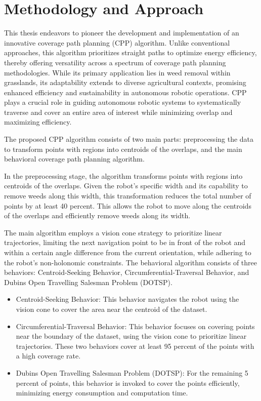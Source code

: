 \section{Methodology and Approach}


This thesis endeavors to pioneer the development and implementation of an innovative coverage path planning (CPP) algorithm. Unlike conventional approaches, this algorithm prioritizes straight paths to optimize energy efficiency, thereby offering versatility across a spectrum of coverage path planning methodologies. While its primary application lies in weed removal within grasslands, its adaptability extends to diverse agricultural contexts, promising enhanced efficiency and sustainability in autonomous robotic operations. CPP plays a crucial role in guiding autonomous robotic systems to systematically traverse and cover an entire area of interest while minimizing overlap and maximizing efficiency. 

\vspace*{3mm} 

The proposed CPP algorithm consists of two main parts: preprocessing the data to transform points with regions into centroids of the overlaps, and the main behavioral coverage path planning algorithm.

\vspace*{3mm} 

In the preprocessing stage, the algorithm transforms points with regions into centroids of the overlaps. Given the robot's specific width and its capability to remove weeds along this width, this transformation reduces the total number of points by at least 40 percent. This allows the robot to move along the centroids of the overlaps and efficiently remove weeds along its width.

\vspace*{3mm} 

The main algorithm employs a vision cone strategy to prioritize linear trajectories, limiting the next navigation point to be in front of the robot and within a certain angle difference from the current orientation, while adhering to the robot's non-holonomic constraints. The behavioral algorithm consists of three behaviors: Centroid-Seeking Behavior, Circumferential-Traversal Behavior, and Dubins Open Travelling Salesman Problem (DOTSP).


\begin{itemize}
  \item Centroid-Seeking Behavior: This behavior navigates the robot using the vision cone to cover the area near the centroid of the dataset.
  \item Circumferential-Traversal Behavior: This behavior focuses on covering points near the boundary of the dataset, using the vision cone to prioritize linear trajectories. These two behaviors cover at least 95 percent of the points with a high coverage rate.
  \item Dubins Open Travelling Salesman Problem (DOTSP): For the remaining 5 percent of points, this behavior is invoked to cover the points efficiently, minimizing energy consumption and computation time.
\end{itemize}


